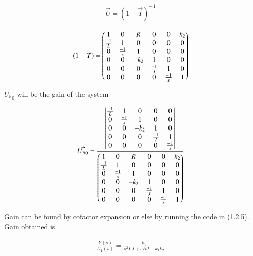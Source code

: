 \begin{enumerate}[label=\thesection.\arabic*.,ref=\thesection.\theenumi]
\begin{align}
    \Vec{U} = {(1-\Vec{T})^-}^1
\end{align}

\begin{align}
    (1-\Vec{T}) = \begin{pmatrix}1 & 0 & R & 0 & 0 & k_2\\
    \frac{-1}{L} & 1 & 0 & 0 & 0 & 0\\
    0 & \frac{-1}{s} & 1 & 0 & 0 & 0\\
    0 & 0 & -k_2 & 1 & 0 & 0\\
    0 & 0 & 0 & \frac{-1}{J} & 1 & 0\\
    0 & 0 & 0 & 0& \frac{-1}{s} & 1 \end{pmatrix} 
\end{align}

${U_5}_0$ will be the gain of the system

\begin{align}
    \Vec{{U_5}_0} = \frac{\begin{vmatrix}\frac{-1}{L} & 1 & 0 & 0 & 0 \\
    0 & \frac{-1}{s} & 1 & 0 & 0 \\
    0 & 0 & -k_2 & 1 & 0 \\
    0 & 0 & 0 & \frac{-1}{J} & 1 \\
    0 & 0 & 0 & 0& \frac{-1}{s} \end{vmatrix}}{ \begin{pmatrix}1 & 0 & R & 0 & 0 & k_2\\
    \frac{-1}{L} & 1 & 0 & 0 & 0 & 0\\
    0 & \frac{-1}{s} & 1 & 0 & 0 & 0\\
    0 & 0 & -k_2 & 1 & 0 & 0\\
    0 & 0 & 0 & \frac{-1}{J} & 1 & 0\\
    0 & 0 & 0 & 0& \frac{-1}{s} & 1 \end{pmatrix}}
\end{align}

Gain can be found by cofactor expansion or else by running the code in (1.2.5).
Gain obtained is 

\begin{align}
    \frac{Y(s)}{U_1(s)}=\frac{k_1}{s^2LJ+sRJ+k_1k_2}
\end{align}



\end{enumerate}